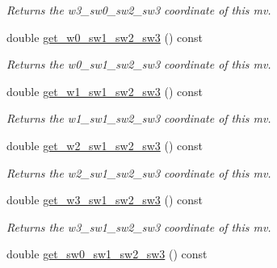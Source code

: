 \begin{DoxyCompactItemize}
\begin{DoxyCompactList}\small\item\em Returns the w3\-\_\-sw0\-\_\-sw2\-\_\-sw3 coordinate of this mv. \end{DoxyCompactList}\item 
\hypertarget{classe3ga_1_1mv_ad5463554e2142aceae7d4e5682481c6d}{double \hyperlink{classe3ga_1_1mv_ad5463554e2142aceae7d4e5682481c6d}{get\-\_\-w0\-\_\-sw1\-\_\-sw2\-\_\-sw3} () const }\label{classe3ga_1_1mv_ad5463554e2142aceae7d4e5682481c6d}

\begin{DoxyCompactList}\small\item\em Returns the w0\-\_\-sw1\-\_\-sw2\-\_\-sw3 coordinate of this mv. \end{DoxyCompactList}\item 
\hypertarget{classe3ga_1_1mv_a1b5c2f76948a1432fbce4137a040bc1f}{double \hyperlink{classe3ga_1_1mv_a1b5c2f76948a1432fbce4137a040bc1f}{get\-\_\-w1\-\_\-sw1\-\_\-sw2\-\_\-sw3} () const }\label{classe3ga_1_1mv_a1b5c2f76948a1432fbce4137a040bc1f}

\begin{DoxyCompactList}\small\item\em Returns the w1\-\_\-sw1\-\_\-sw2\-\_\-sw3 coordinate of this mv. \end{DoxyCompactList}\item 
\hypertarget{classe3ga_1_1mv_acb55ae501c8d6d3e13077c302720358d}{double \hyperlink{classe3ga_1_1mv_acb55ae501c8d6d3e13077c302720358d}{get\-\_\-w2\-\_\-sw1\-\_\-sw2\-\_\-sw3} () const }\label{classe3ga_1_1mv_acb55ae501c8d6d3e13077c302720358d}

\begin{DoxyCompactList}\small\item\em Returns the w2\-\_\-sw1\-\_\-sw2\-\_\-sw3 coordinate of this mv. \end{DoxyCompactList}\item 
\hypertarget{classe3ga_1_1mv_ad2e7ed40dd19ead96966360e9d0d4fc7}{double \hyperlink{classe3ga_1_1mv_ad2e7ed40dd19ead96966360e9d0d4fc7}{get\-\_\-w3\-\_\-sw1\-\_\-sw2\-\_\-sw3} () const }\label{classe3ga_1_1mv_ad2e7ed40dd19ead96966360e9d0d4fc7}

\begin{DoxyCompactList}\small\item\em Returns the w3\-\_\-sw1\-\_\-sw2\-\_\-sw3 coordinate of this mv. \end{DoxyCompactList}\item 
\hypertarget{classe3ga_1_1mv_a699a0ac447d5bf97efa19eec6bd6dd41}{double \hyperlink{classe3ga_1_1mv_a699a0ac447d5bf97efa19eec6bd6dd41}{get\-\_\-sw0\-\_\-sw1\-\_\-sw2\-\_\-sw3} () const }\label{classe3ga_1_1mv_a699a0ac447d5bf97efa19eec6bd6dd41}


\end{DoxyCompactItemize}
